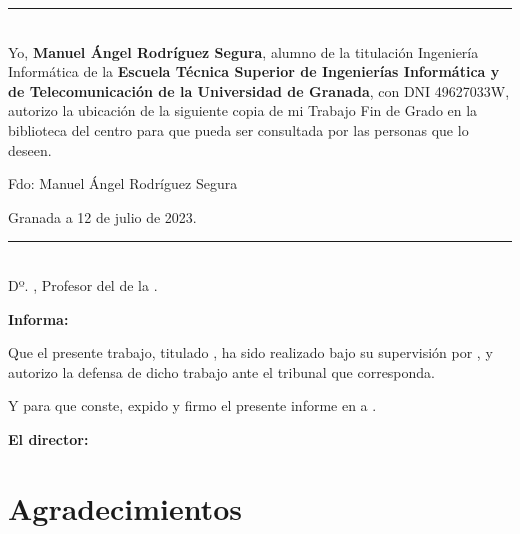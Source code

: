 \cleardoublepage
\thispagestyle{empty}

\noindent\rule[-1ex]{\textwidth}{2pt}\\[4.5ex]

Yo, \textbf{Manuel Ángel Rodríguez Segura}, alumno de la titulación Ingeniería Informática de la \textbf{Escuela Técnica Superior
de Ingenierías Informática y de Telecomunicación de la Universidad de Granada}, con DNI 49627033W, autorizo la
ubicación de la siguiente copia de mi Trabajo Fin de Grado en la biblioteca del centro para que pueda ser
consultada por las personas que lo deseen.

\vspace{6cm}

\noindent Fdo: Manuel Ángel Rodríguez Segura

\vspace{2cm}

\begin{flushright}
Granada a 12 de julio de 2023.
\end{flushright}


\cleardoublepage
\thispagestyle{empty}

\noindent\rule[-1ex]{\textwidth}{2pt}\\[4.5ex]

Dº. \textbf{\myProf}, Profesor del \myDepartment de la \myUni.

\vspace{0.5cm}

\textbf{Informa:}

\vspace{0.5cm}

Que el presente trabajo, titulado \textit{\textbf{\myTitle}},
ha sido realizado bajo su supervisión por \textbf{\myName}, y autorizo la defensa de dicho trabajo ante el tribunal
que corresponda.

\vspace{0.5cm}

Y para que conste, expido y firmo el presente informe en \myLocation a \myTime.

\vspace{1cm}

\textbf{El director:}

\vspace{5cm}

\noindent \textbf{\myProf}

\chapter*{Agradecimientos}
\thispagestyle{empty}


